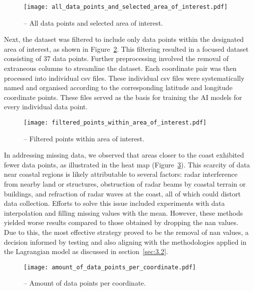 \begin{figure}[H]
    \centering
    \texttt{[image: all\_data\_points\_and\_selected\_area\_of\_interest.pdf]}
    \caption[All data points and selected area of interest.]{-- All data points and selected area of interest.\label{fig_3.3}}
\end{figure}

Next, the dataset was filtered to include only data points within the designated area of interest, as shown in Figure~\ref{fig_3.4}. This filtering resulted in a focused dataset consisting of 37 data points. Further preprocessing involved the removal of extraneous columns to streamline the dataset. Each coordinate pair was then processed into individual \acrshort{csv} files. These individual \acrshort{csv} files were systematically named and organised according to the corresponding latitude and longitude coordinate points. These files served as the basis for training the AI models for every individual data point.

\begin{figure}[H]
    \centering
    \texttt{[image: filtered\_points\_within\_area\_of\_interest.pdf]}
    \caption[Filtered points within area of interest.]{-- Filtered points within area of interest.\label{fig_3.4}}
\end{figure}

In addressing missing data, we observed that areas closer to the coast exhibited fewer data points, as illustrated in the heat map (Figure~\ref{fig_3.5}). This scarcity of data near coastal regions is likely attributable to several factors: radar interference from nearby land or structures, obstruction of radar beams by coastal terrain or buildings, and refraction of radar waves at the coast, all of which could distort data collection. Efforts to solve this issue included experiments with data interpolation and filling missing values with the mean. However, these methods yielded worse results compared to those obtained by dropping the \acrshort{nan} values. Due to this, the most effective strategy proved to be the removal of \acrshort{nan} values, a decision informed by testing and also aligning with the methodologies applied in the Lagrangian model as discussed in section~\ref{sec:3.2}. 

\begin{figure}[htbp]
    \centering
    \texttt{[image: amount\_of\_data\_points\_per\_coordinate.pdf]}
    \caption[Amount of data points per coordinate.]{-- Amount of data points per coordinate.\label{fig_3.5}}
\end{figure}

